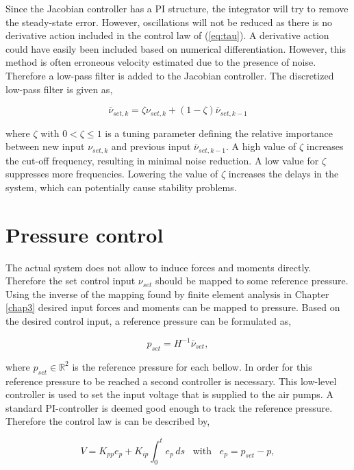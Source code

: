 Since the Jacobian controller has a PI structure, the integrator will try to remove the steady-state error. However, oscillations will not be reduced as there is no derivative action included in the control law of (\ref{eq:tau}). A derivative action could have easily been included based on numerical differentiation. However, this method is often erroneous velocity estimated due to the presence of noise. Therefore a low-pass filter is added to the Jacobian controller. The discretized low-pass filter is given as,

\begin{equation}
\bar{\nu}_{set,k} = \zeta \nu_{set,k} + (1-\zeta)\bar{\nu}_{set,k-1}
\end{equation}

where $\zeta$ with $ 0 < \zeta \leq 1$ is a tuning parameter defining the relative importance between new input $\nu_{set,k}$ and previous input $\bar{\nu}_{set,k-1}$. A high value of $\zeta$ increases the cut-off frequency, resulting in minimal noise reduction. A low value for $\zeta$ suppresses more frequencies. Lowering the value of $\zeta$ increases the delays in the system, which can potentially cause stability problems. 




\section{Pressure control}


The actual system does not allow to induce forces and moments directly. Therefore the set control input $\nu_{set}$ should be mapped to some reference pressure. Using the inverse of the mapping found by finite element analysis in Chapter \ref{chap3} desired input forces and moments can be mapped to pressure. Based on the desired control input, a reference pressure can be formulated as,

\begin{equation}
    p_{set} = H^{-1}\bar{\nu}_{set},
\end{equation}


where $p_{set} \in \mathbb{R}^2$ is the reference pressure for each bellow. In order for this reference pressure to be reached a second controller is necessary. This low-level controller is used to set the input voltage that is supplied to the air pumps. A standard PI-controller is deemed good enough to track the reference pressure. Therefore the control law is can be described by,

\begin{equation}
    V = K_{pp}e_p + K_{ip} \int_0^t e_p \hspace{2pt} ds \hspace{10pt} \text{with} \hspace{10pt} e_p = p_{set} - p,
\end{equation}

